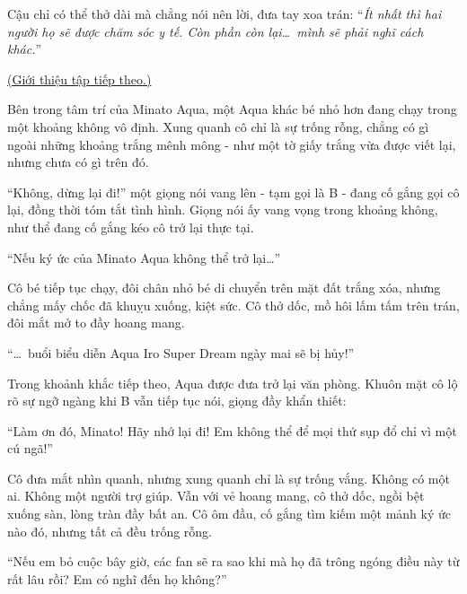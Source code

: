 \documentclass[../main.tex]{subfiles}
\begin{document}
Cậu chỉ có thể thở dài mà chẳng nói nên lời, đưa tay xoa trán: ``\textit{Ít nhất thì hai người họ sẽ được chăm sóc y tế. Còn phần còn lại\dots\ mình sẽ phải nghĩ cách khác.}''

\omk

\begin{center}
  \uline{(Giới thiệu tập tiếp theo.)}
\end{center}

Bên trong tâm trí của Minato Aqua, một Aqua khác bé nhỏ hơn đang chạy trong một khoảng không vô định. Xung quanh cô chỉ là sự trống rỗng, chẳng có gì ngoài những khoảng trắng mênh mông - như một tờ giấy trắng vừa được viết lại, nhưng chưa có gì trên đó.


``Không, dừng lại đi!'' một giọng nói vang lên - tạm gọi là B - đang cố gắng gọi cô lại, đồng thời tóm tắt tình hình. Giọng nói ấy vang vọng trong khoảng không, như thể đang cố gắng kéo cô trở lại thực tại.

\begin{center}
  ``Nếu ký ức của Minato Aqua không thể trở lại\dots''
\end{center}

Cô bé tiếp tục chạy, đôi chân nhỏ bé di chuyển trên mặt đất trắng xóa, nhưng chẳng mấy chốc đã khuỵu xuống, kiệt sức. Cô thở dốc, mồ hôi lấm tấm trên trán, đôi mắt mở to đầy hoang mang.

\begin{center}
  ``\dots\ buổi biểu diễn Aqua Iro Super Dream ngày mai sẽ bị hủy!''
\end{center}

Trong khoảnh khắc tiếp theo, Aqua được đưa trở lại văn phòng. Khuôn mặt cô lộ rõ sự ngỡ ngàng khi B vẫn tiếp tục nói, giọng đầy khẩn thiết:

\begin{center}
  ``Làm ơn đó, Minato! Hãy nhớ lại đi! Em không thể để mọi thứ sụp đổ chỉ vì một cú ngã!''
\end{center}


Cô đưa mắt nhìn quanh, nhưng xung quanh chỉ là sự trống vắng. Không có một ai. Không một người trợ giúp. Vẫn với vẻ hoang mang, cô thở dốc, ngồi bệt xuống sàn, lòng tràn đầy bất an. Cô ôm đầu, cố gắng tìm kiếm một mảnh ký ức nào đó, nhưng tất cả đều trống rỗng.

\begin{center}
  ``Nếu em bỏ cuộc bây giờ, các fan sẽ ra sao khi mà họ đã trông ngóng điều này từ rất lâu rồi? Em có nghĩ đến họ không?''
\end{center}
\end{document}
